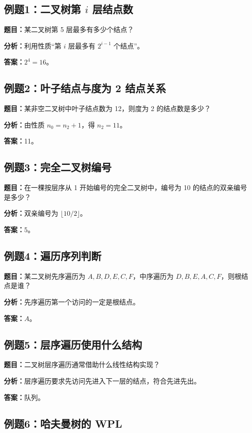\documentclass{../../note}
\begin{document}
\subsection{例题1：二叉树第 $i$ 层结点数}

\textbf{题目：}某二叉树第 5 层最多有多少个结点？

\textbf{分析：}利用性质“第 $i$ 层最多有 $2^{i-1}$ 个结点”。

\textbf{答案：}$2^4 = 16$。

\subsection{例题2：叶子结点与度为 2 结点关系}

\textbf{题目：}某非空二叉树中叶子结点数为 12，则度为 2 的结点数是多少？

\textbf{分析：}由性质 $n_0 = n_2 + 1$，得 $n_2 = 11$。

\textbf{答案：}11。

\subsection{例题3：完全二叉树编号}

\textbf{题目：}在一棵按层序从 1 开始编号的完全二叉树中，编号为 10 的结点的双亲编号是多少？

\textbf{分析：}双亲编号为 $\lfloor 10/2 \rfloor$。

\textbf{答案：}5。

\subsection{例题4：遍历序列判断}

\textbf{题目：}某二叉树先序遍历为 $A,B,D,E,C,F$，中序遍历为 $D,B,E,A,C,F$，则根结点是谁？

\textbf{分析：}先序遍历第一个访问的一定是根结点。

\textbf{答案：}$A$。

\subsection{例题5：层序遍历使用什么结构}

\textbf{题目：}二叉树层序遍历通常借助什么线性结构实现？

\textbf{分析：}层序遍历要求先访问先进入下一层的结点，符合先进先出。

\textbf{答案：}队列。

\subsection{例题6：哈夫曼树的 WPL}
\end{document}
